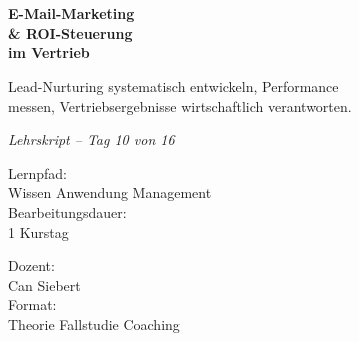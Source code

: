 \documentclass[11pt,a4paper,oneside]{article}
\newcommand{\caveatfontfallback}{\itshape}
\newcommand\caveatfont{\caveatfontfallback}%
\begin{document}
\begin{titlepage}
  \pagestyle{empty}
  \vspace*{1.5cm}
  \\[2pt]
  \noindent{\color{lpAccent}\rule{\linewidth}{1.2pt}}\\[4pt]

  \vspace{3cm}
  {\sffamily\fontsize{30}{34}\selectfont\bfseries\color{lpInk}E-Mail-Marketing\\\& ROI-Steuerung\\im Vertrieb\par}

  \vspace{0.7cm}
  {\sffamily\large\color{lpGray}Lead-Nurturing systematisch entwickeln, Performance\\messen, Vertriebsergebnisse wirtschaftlich verantworten.\par}

  \vspace{1.5cm}
  {\caveatfont\LARGE\color{lpAmber}Lehrskript -- Tag 10 von 16}\par

  \vfill

  \noindent\begin{minipage}{0.55\linewidth}
    {\sffamily\footnotesize\color{lpGray}Lernpfad:}\\
    {\sffamily\small\color{lpInk}Wissen \textrightarrow{} Anwendung \textrightarrow{} Management}\\[10pt]
    {\sffamily\footnotesize\color{lpGray}Bearbeitungsdauer:}\\
    {\sffamily\small\color{lpInk}1 Kurstag}
  \end{minipage}\hfill
  \begin{minipage}{0.4\linewidth}
    \raggedleft
    {\sffamily\footnotesize\color{lpGray}Dozent:}\\
    {\sffamily\small\color{lpInk}Can Siebert}\\[10pt]
    {\sffamily\footnotesize\color{lpGray}Format:}\\
    {\sffamily\small\color{lpInk}Theorie \textperiodcentered{} Fallstudie \textperiodcentered{} Coaching}
  \end{minipage}

  \vspace{0.5cm}
  \noindent{\color{lpAccent}\rule{\linewidth}{0.6pt}}
\end{titlepage}
\end{document}
